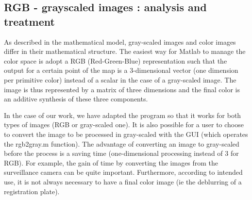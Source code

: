 \subsection{RGB - grayscaled images : analysis and treatment}

As described in the mathematical model, gray-scaled images and color images differ in their mathematical structure. The easiest way for Matlab to manage the color space is adopt a RGB (Red-Green-Blue) representation such that the output for a certain point of the map is a 3-dimensional vector (one dimension per primitive color) instead of a scalar in the case of a gray-scaled image. The image is thus represented by a matrix of three dimensions and the final color is an additive synthesis of these three components.
 
In the case of our work, we have adapted the program so that it works for both types of images (RGB or gray-scaled one). It is also possible for a user to choose to convert the image to be processed in gray-scaled with the GUI (which operates the rgb2gray.m function). The advantage of converting an image to gray-scaled before the process is a saving time (one-dimensional processing instead of 3 for RGB). For example, the gain of time by converting the images from the surveillance camera can be quite important. Furthermore, according to intended use, it is not always necessary to have a final color image (ie the deblurring of a registration plate).